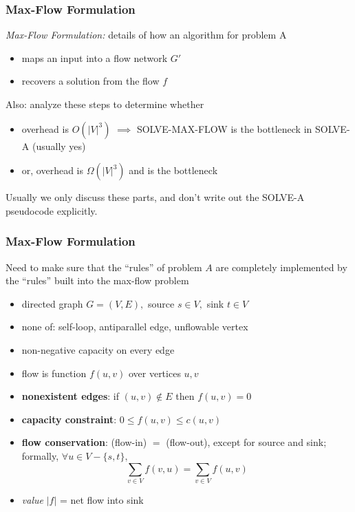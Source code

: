 \documentclass{beamer}
\begin{document}
\begin{frame} \frametitle{Max-Flow Formulation}

\emph{Max-Flow Formulation:} details of how an algorithm for problem A
\begin{itemize}
  \item maps an input into a flow network $G'$
  \item recovers a solution from the flow $f$
\end{itemize}
\vspace{.5cm}
Also: analyze these steps to determine whether
\begin{itemize}
  \item overhead is $O(|V|^3)$ $\implies$ SOLVE-MAX-FLOW
    is the bottleneck in SOLVE-A (usually yes)
  \item or, overhead is $\Omega(|V|^3)$ and is the bottleneck
\end{itemize}
\vspace{.5cm}
Usually we only discuss these parts, and don't write out the SOLVE-A pseudocode
explicitly.
\end{frame}

\begin{frame} \frametitle{Max-Flow Formulation}
Need to make sure that the ``rules'' of problem $A$ are completely implemented
by the ``rules'' built into the max-flow problem
\begin{itemize}
  \item directed graph $G=(V, E),$ source $s \in V,$ sink $t \in V$
  \item none of: self-loop, antiparallel edge, unflowable vertex
  \item non-negative capacity on every edge
  \item flow is function $f(u, v)$ over vertices $u, v$
  \item \textbf{nonexistent edges}: if $(u, v) \notin E$ then $f(u, v) = 0$
  \item \textbf{capacity constraint}: $0 \leq f(u, v) \leq c(u, v)$
  \item \textbf{flow conservation}: (flow-in) $=$ (flow-out), except for source and
    sink; formally, $\forall u \in V - \{s, t\},$
    \[ \sum_{v \in V} f(v, u) = \sum_{v \in V} f(u, v) \]
  \item \emph{value} $|f|$ = net flow into sink
  \end{itemize}
\end{frame}
\end{document}
